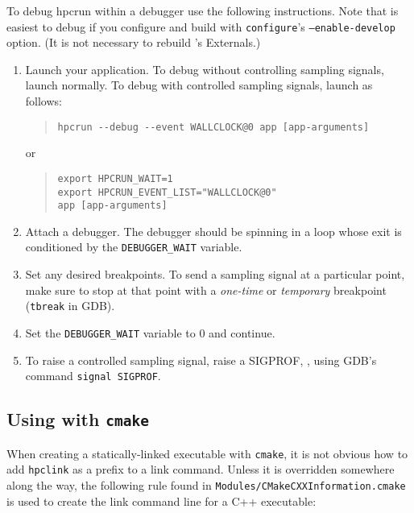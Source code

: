 \documentclass[11pt,letterpaper]{report}
\begin{document}
To debug hpcrun within a debugger use the following instructions.
Note that \hpcrun{} is easiest to debug if you configure and build \HPCToolkit{} with \texttt{configure}'s \texttt{--enable-develop} option.
(It is not necessary to rebuild \HPCToolkit{}'s Externals.)
%
\begin{enumerate}

\item Launch your application.
  To debug \hpcrun{} without controlling sampling signals, launch normally.
  To debug \hpcrun{} with controlled sampling signals, launch as follows:
\begin{quote}
\begin{verbatim}
hpcrun --debug --event WALLCLOCK@0 app [app-arguments]
\end{verbatim}
\end{quote}
or
\begin{quote}
\begin{verbatim}
export HPCRUN_WAIT=1
export HPCRUN_EVENT_LIST="WALLCLOCK@0"
app [app-arguments]
\end{verbatim}
\end{quote}

\item Attach a debugger.
  The debugger should be spinning in a loop whose exit is conditioned by the \verb|DEBUGGER_WAIT| variable.

\item Set any desired breakpoints.
  To send a sampling signal at a particular point, make sure to stop at that point with a \emph{one-time} or \emph{temporary} breakpoint (\texttt{tbreak} in GDB).

\item Set the \verb|DEBUGGER_WAIT| variable to 0 and continue.

\item To raise a controlled sampling signal, raise a SIGPROF, \eg{}, using GDB's command \verb|signal SIGPROF|.

\end{enumerate}

\subsection{Using \hpclink{} with {\tt cmake}}

When creating a statically-linked executable with {\tt cmake}, it is not obvious how to add {\tt hpclink} as a prefix to a link command. Unless it is overridden somewhere  along the way, the following rule found in {\tt Modules/CMakeCXXInformation.cmake} is
used to create the link command line for a C++ executable:
\end{document}
